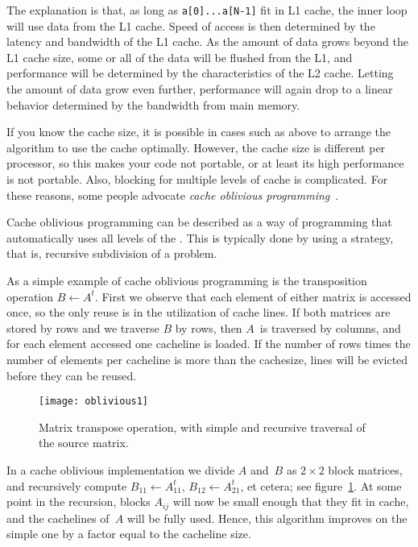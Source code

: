 The explanation is that,
as long as \texttt{a[0]...a[N-1]} fit in L1 cache, the inner loop will
use data from the L1 cache. Speed of access is then determined by the
latency and bandwidth of the L1 cache.
As the amount of data grows beyond the L1 cache size, some or all of
the data will be flushed from the L1, and performance will be determined by
the characteristics of the L2 cache. Letting the amount of data grow
even further, performance will again drop to a linear behavior
determined by the bandwidth from main memory.


If you know the cache size, it is possible in cases such as above to
arrange the algorithm to use the cache optimally. However, the cache
size is different per processor, so this makes your code not portable,
or at least its high performance is not portable. Also, blocking for
multiple levels of cache is complicated. For these reasons, some
people advocate \emph{cache oblivious
  programming}~\cite{Frigo:oblivious}. 

Cache oblivious programming can be described as a way of programming
that automatically uses all levels of the
. This is typically done by using a
 strategy, that is, recursive
subdivision of a problem.

As a simple example of cache oblivious programming is the 
{transposition} operation $B\leftarrow A^t$. First we observe that each
element of either matrix is accessed once, so the only reuse is in the
utilization of cache lines. If both matrices are stored by
rows and we traverse $B$ by rows, then $A$~is traversed by columns,
and for each element accessed one cacheline is loaded. If the number
of rows times the number of elements per cacheline is more than the
cachesize, lines will be evicted before they can be reused.

\begin{figure}[ht]
  \texttt{[image: oblivious1]}
  \caption{Matrix transpose operation, with simple and recursive
    traversal of the source matrix.}
  \label{fig:oblivious-transpose}
\end{figure}
In a cache oblivious implementation we divide $A$ and~$B$ as
$2\times2$ block matrices, and recursively compute $B_{11}\leftarrow
A_{11}^t$, $B_{12}\leftarrow A_{21}^t$, et cetera; see
figure~\ref{fig:oblivious-transpose}. At some point in the recursion,
blocks $A_{ij}$ will now be small enough that they fit in cache, and
the cachelines of~$A$ will be fully used. Hence, this algorithm
improves on the simple one by a factor equal to the cacheline size.

